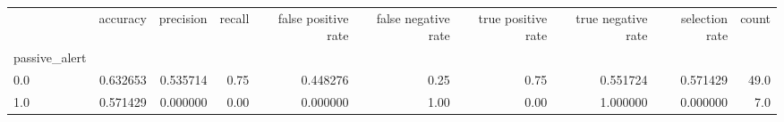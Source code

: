\begin{tabular}{lrrrrrrrrr}
\toprule
{} &  accuracy &  precision &  recall &  false positive rate &  false negative rate &  true positive rate &  true negative rate &  selection rate &  count \\
passive\_alert &           &            &         &                      &                      &                     &                     &                 &        \\
\midrule
0.0           &  0.632653 &   0.535714 &    0.75 &             0.448276 &                 0.25 &                0.75 &            0.551724 &        0.571429 &   49.0 \\
1.0           &  0.571429 &   0.000000 &    0.00 &             0.000000 &                 1.00 &                0.00 &            1.000000 &        0.000000 &    7.0 \\
\bottomrule
\end{tabular}
